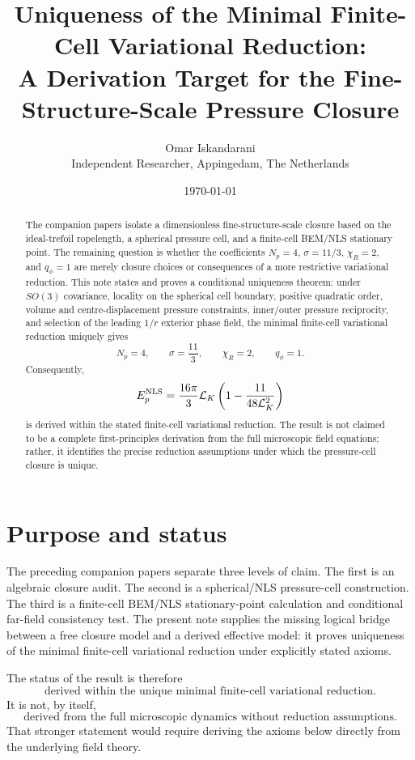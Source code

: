 \documentclass[11pt]{article}
\title{Uniqueness of the Minimal Finite-Cell Variational Reduction:\\
A Derivation Target for the Fine-Structure-Scale Pressure Closure}
\author{Omar Iskandarani\\
Independent Researcher, Appingedam, The Netherlands}
\date{\today}
\newcommand{\LK}{\mathcal L_K}
\newcommand{\EpNLS}{E_p^{\rm NLS}}
\begin{document}
\maketitle

\begin{abstract}
The companion papers isolate a dimensionless fine-structure-scale closure based
on the ideal-trefoil ropelength, a spherical pressure cell, and a finite-cell
BEM/NLS stationary point.  The remaining question is whether the coefficients
\(N_p=4\), \(\sigma=11/3\), \(\chi_R=2\), and \(q_\phi=1\) are merely closure
choices or consequences of a more restrictive variational reduction.  This note
states and proves a conditional uniqueness theorem: under \(SO(3)\) covariance,
locality on the spherical cell boundary, positive quadratic order, volume and
centre-displacement pressure constraints, inner/outer pressure reciprocity, and
selection of the leading \(1/r\) exterior phase field, the minimal finite-cell
variational reduction uniquely gives
\[
  N_p=4,\qquad
  \sigma=\frac{11}{3},\qquad
  \chi_R=2,\qquad
  q_\phi=1.
\]
Consequently,
\[
  \EpNLS
  =
  \frac{16\pi}{3}\LK
  \left(1-\frac{11}{48\LK^2}\right)
\]
is derived within the stated finite-cell variational reduction.  The result is
not claimed to be a complete first-principles derivation from the full
microscopic field equations; rather, it identifies the precise reduction
assumptions under which the pressure-cell closure is unique.
\end{abstract}

\section{Purpose and status}

The preceding companion papers separate three levels of claim.  The first is
an algebraic closure audit.  The second is a spherical/NLS pressure-cell
construction.  The third is a finite-cell BEM/NLS stationary-point calculation
and conditional far-field consistency test.  The present note supplies the
missing logical bridge between a free closure model and a derived effective
model: it proves uniqueness of the minimal finite-cell variational reduction
under explicitly stated axioms.

The status of the result is therefore
\[
  \boxed{\text{derived within the unique minimal finite-cell variational reduction}.}
\]
It is not, by itself,
\[
  \boxed{\text{derived from the full microscopic dynamics without reduction assumptions}.}
\]
That stronger statement would require deriving the axioms below directly from
the underlying field theory.
\end{document}
